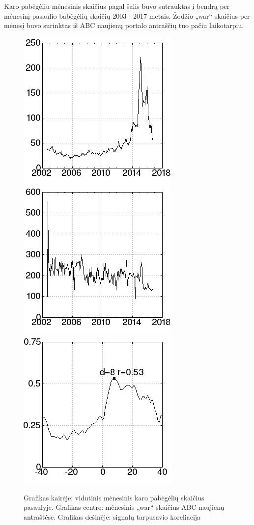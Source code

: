 Karo pabėgėliu mėnesinis skaičius pagal šalis\cite{refugees} buvo sutrauktas į bendrą per mėnesinį pasaulio babėgėlių skaičių 2003 - 2017 metais.
Žodžio „war“ skaičius per mėnesį buvo surinktas iš ABC naujienų portalo antraščių\cite{abcNews} tuo pačiu laikotarpiu.

\begin{figure}
\includegraphics[scale=0.65]{../scripts/refugees_war/refugees.png}
\includegraphics[scale=0.65]{../scripts/refugees_war/war.png}
\includegraphics[scale=0.65]{../scripts/refugees_war/result.png}
    \caption{Grafikas kairėje: vidutinis mėnesinis karo pabėgėlių skaičius pasaulyje. Grafikas centre: mėnesinis „war“ skaičius ABC naujienų antraštėse. Grafikas dešinėje: signalų tarpusavio koreliacija}
\end{figure}

